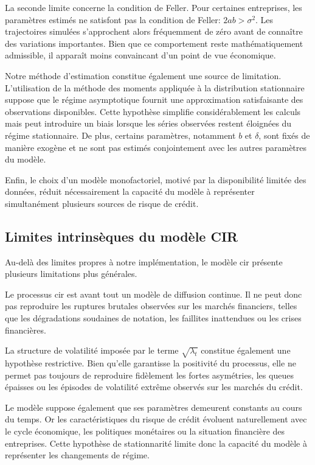 La seconde limite concerne la condition de Feller. Pour certaines entreprises, les paramètres estimés ne satisfont pas la condition de Feller: $2ab > \sigma^2$. Les trajectoires simulées s'approchent alors fréquemment de zéro avant de connaître des variations importantes. Bien que ce comportement reste mathématiquement admissible, il apparaît moins convaincant d'un point de vue économique.

Notre méthode d'estimation constitue également une source de limitation. L'utilisation de la méthode des moments appliquée à la distribution stationnaire suppose que le régime asymptotique fournit une approximation satisfaisante des observations disponibles. Cette hypothèse simplifie considérablement les calculs mais peut introduire un biais lorsque les séries observées restent éloignées du régime stationnaire. De plus, certains paramètres, notamment $b$ et $\delta$, sont fixés de manière exogène et ne sont pas estimés conjointement avec les autres paramètres du modèle.

Enfin, le choix d'un modèle monofactoriel, motivé par la disponibilité limitée des données, réduit nécessairement la capacité du modèle à représenter simultanément plusieurs sources de risque de crédit.

\subsection{Limites intrinsèques du modèle CIR}

Au-delà des limites propres à notre implémentation, le modèle \gls{cir} présente plusieurs limitations plus générales.

Le processus \gls{cir} est avant tout un modèle de diffusion continue. Il ne peut donc pas reproduire les ruptures brutales observées sur les marchés financiers, telles que les dégradations soudaines de notation, les faillites inattendues ou les crises financières.

La structure de volatilité imposée par le terme $\sqrt{\lambda_t}$ constitue également une hypothèse restrictive. Bien qu'elle garantisse la positivité du processus, elle ne permet pas toujours de reproduire fidèlement les fortes asymétries, les queues épaisses ou les épisodes de volatilité extrême observés sur les marchés du crédit.

Le modèle suppose également que ses paramètres demeurent constants au cours du temps. Or les caractéristiques du risque de crédit évoluent naturellement avec le cycle économique, les politiques monétaires ou la situation financière des entreprises. Cette hypothèse de stationnarité limite donc la capacité du modèle à représenter les changements de régime.

